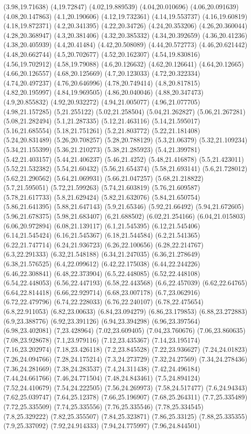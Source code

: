(3.98,19.71638) (4,19.72847) (4.02,19.889539) (4.04,20.010696) (4.06,20.091639) (4.08,20.147863) (4.1,20.190606) (4.12,19.732361) (4.14,19.553737) (4.16,19.60819) (4.18,19.872371) (4.2,20.341395) (4.22,20.34726) (4.24,20.353206) (4.26,20.360044) (4.28,20.368947) (4.3,20.381406) (4.32,20.385332) (4.34,20.392659) (4.36,20.41236) (4.38,20.405939) (4.4,20.41484) (4.42,20.508089) (4.44,20.572773) (4.46,20.621442) (4.48,20.662744) (4.5,20.702677) (4.52,20.162307) (4.54,19.830816) (4.56,19.702912) (4.58,19.79088) (4.6,20.126632) (4.62,20.126641) (4.64,20.12665) (4.66,20.126557) (4.68,20.125669) (4.7,20.123033) (4.72,20.322334) (4.74,20.497237) (4.76,20.646996) (4.78,20.749414) (4.8,20.817815) (4.82,20.195997) (4.84,19.969505) (4.86,20.040046) (4.88,20.347473) (4.9,20.855832) (4.92,20.932272) (4.94,21.005077) (4.96,21.077705) (4.98,21.157285) (5,21.255122) (5.02,21.258504) (5.04,21.262827) (5.06,21.267281) (5.08,21.282494) (5.1,21.287335) (5.12,21.463116) (5.14,21.595017) (5.16,21.685554) (5.18,21.751261) (5.2,21.803772) (5.22,21.181408) (5.24,20.831489) (5.26,20.708257) (5.28,20.788129) (5.3,21.06379) (5.32,21.109234) (5.34,21.155399) (5.36,21.210273) (5.38,21.285923) (5.4,21.399781) (5.42,21.403157) (5.44,21.406237) (5.46,21.4252) (5.48,21.416878) (5.5,21.423011) (5.52,21.532382) (5.54,21.60432) (5.56,21.654374) (5.58,21.693141) (5.6,21.728012) (5.62,21.290562) (5.64,21.069931) (5.66,21.047257) (5.68,21.218822) (5.7,21.595051) (5.72,21.599263) (5.74,21.603819) (5.76,21.609587) (5.78,21.617733) (5.8,21.629424) (5.82,21.632076) (5.84,21.650754) (5.86,21.641395) (5.88,21.647143) (5.9,21.65346) (5.92,21.66492) (5.94,21.672605) (5.96,21.678375) (5.98,21.683407) (6,21.688502) (6.02,21.254166) (6.04,21.015803) (6.06,20.972894) (6.08,21.139117) (6.1,21.545395) (6.12,21.545406) (6.14,21.545424) (6.16,21.545367) (6.18,21.544584) (6.2,21.541365) (6.22,21.747714) (6.24,21.936723) (6.26,22.100656) (6.28,22.214767) (6.3,22.291333) (6.32,21.548188) (6.34,21.247035) (6.36,21.278649) (6.38,21.576525) (6.4,22.099612) (6.42,22.175038) (6.44,22.244226) (6.46,22.308841) (6.48,22.373904) (6.5,22.448085) (6.52,22.448108) (6.54,22.448053) (6.56,22.447193) (6.58,22.443568) (6.6,22.457039) (6.62,22.64765) (6.64,22.814418) (6.66,22.929714) (6.68,23.007178) (6.7,23.062916) (6.72,22.479796) (6.74,22.228033) (6.76,22.240107) (6.78,22.475654) (6.8,22.911053) (6.82,23.00633) (6.84,23.094279) (6.86,23.179853) (6.88,23.272883) (6.9,23.388776) (6.92,23.391126) (6.94,23.394298) (6.96,23.397564) (6.98,23.402081) (7,23.428964) (7.02,23.609405) (7.04,23.760676) (7.06,23.860635) (7.08,23.928678) (7.1,23.979116) (7.12,23.435367) (7.14,23.195174) (7.16,23.202974) (7.18,23.426118) (7.2,23.845528) (7.22,23.936627) (7.24,24.01823) (7.26,24.094766) (7.28,24.175214) (7.3,24.273729) (7.32,24.27569) (7.34,24.278436) (7.36,24.281669) (7.38,24.283537) (7.4,24.311438) (7.42,24.496184) (7.44,24.661766) (7.46,24.771504) (7.48,24.843461) (7.5,24.894124) (7.52,24.410679) (7.54,24.222505) (7.56,24.269973) (7.58,24.517477) (7.6,24.94343) (7.62,25.039747) (7.64,25.12378) (7.66,25.196907) (7.68,25.264311) (7.7,25.335489) (7.72,25.335509) (7.74,25.335556) (7.76,25.335546) (7.78,25.334545) (7.8,25.329222) (7.82,25.355507) (7.84,25.323871) (7.86,25.33125) (7.88,25.335355) (7.9,25.337092) (7.92,24.914333) (7.94,24.775997) (7.96,24.844501) 